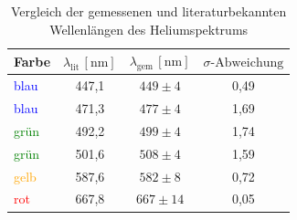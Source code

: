 \begin{table}[h!]
    \centering
    \label{tab:helium_wellenlaengen}
    \begin{tabular}{lccc}
        \hline
        \textbf{Farbe} & \(\lambda_{\text{lit}}\,[\text{nm}]\) & \(\lambda_{\text{gem}}\,[\text{nm}]\) & \(\sigma\text{-Abweichung}\) \\
        \hline
        \textcolor{blue}{blau} & 447,1 & \(449 \pm 4\) & 0,49 \\
        \textcolor{blue}{blau} & 471,3 & \(477 \pm 4\) & 1,69 \\
        \textcolor{green}{grün} & 492,2 & \(499 \pm 4\) & 1,74 \\
        \textcolor{green}{grün} & 501,6 & \(508 \pm 4\) & 1,59 \\
        \textcolor{orange}{gelb} & 587,6 & \(582 \pm 8\) & 0,72 \\
        \textcolor{red}{rot} & 667,8 & \(667 \pm 14\) & 0,05 \\
        \hline
    \end{tabular}
    \caption{Vergleich der gemessenen und literaturbekannten Wellenlängen des Heliumspektrums}
\end{table}




